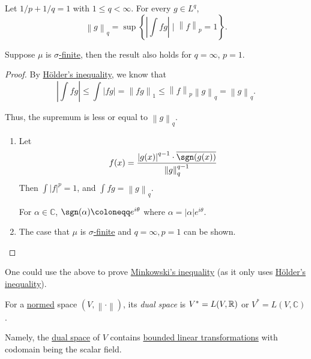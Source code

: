 \begin{proposition}\label{prop:Lp-dual-formula}
	Let \(1/p + 1/q = 1\) with \(1 \leq q < \infty\). For every \(g \in L^q\),
	\[
		\left\lVert g\right\rVert_q = \sup\left\{\left\vert \int fg \right\vert  \mid \left\lVert f\right\rVert_p = 1\right\}.
	\]

	Suppose \(\mu \) is \hyperref[def:sigma-finite-measure]{\(\sigma\)-finite}, then the result also holds for \(q = \infty\), \(p = 1\).
\end{proposition}
\begin{proof}
	By \hyperref[thm:Holder-inequality]{Hölder's inequality}, we know that
	\[
		\left\vert \int fg \right\vert  \leq \int \left\vert fg \right\vert  = \left\lVert fg\right\rVert_1 \leq \left\lVert f\right\rVert _p \left\lVert g\right\rVert_q = \left\lVert g\right\rVert_q.
	\]

	Thus, the supremum is less or equal to \(\left\lVert g\right\rVert_q\).

	\begin{enumerate}[(1)]
		\item Let
		      \[
			      f(x) = \frac{\left\vert g(x) \right\vert ^{q-1}\cdot \overline{\sgn(g(x))}}{\left\lVert g\right\rVert_q^{q-1}}
		      \]
		      Then \(\int \left\vert f \right\vert ^p = 1\), and \(\int fg = \left\lVert g\right\rVert _q\).
		      \begin{note}
			      For \(\alpha \in \mathbb{C}\), \(\sgn (\alpha) \coloneqq e^{i\theta}\) where \(\alpha = \left\vert \alpha \right\vert e^{i\theta}\).
		      \end{note}
		\item The case that \(\mu\) is \hyperref[def:sigma-finite-measure]{\(\sigma\)-finite} and \(q = \infty, p = 1\) can be shown.
	\end{enumerate}
\end{proof}

\begin{remark}
	One could use the above to prove \hyperref[thm:Minkowski-inequality]{Minkowski's inequality} (as it only uses \hyperref[thm:Holder-inequality]{Hölder's inequality}).
\end{remark}

\begin{definition}\label{def:dual-space}
	For a \hyperref[def:norm]{normed} space \((V, \left\lVert \cdot\right\rVert )\), its \emph{dual space} is \(V^\ast = L(V, \mathbb{\MakeUppercase{r}} )\) or
	\(V^\ast = L(V, \mathbb{C})\).
\end{definition}
\begin{remark}
	Namely, the \hyperref[def:dual-space]{dual space} of \(V\) contains \hyperref[def:bounded-linear-transformation]{bounded linear transformations} with codomain being the scalar field.
\end{remark}

